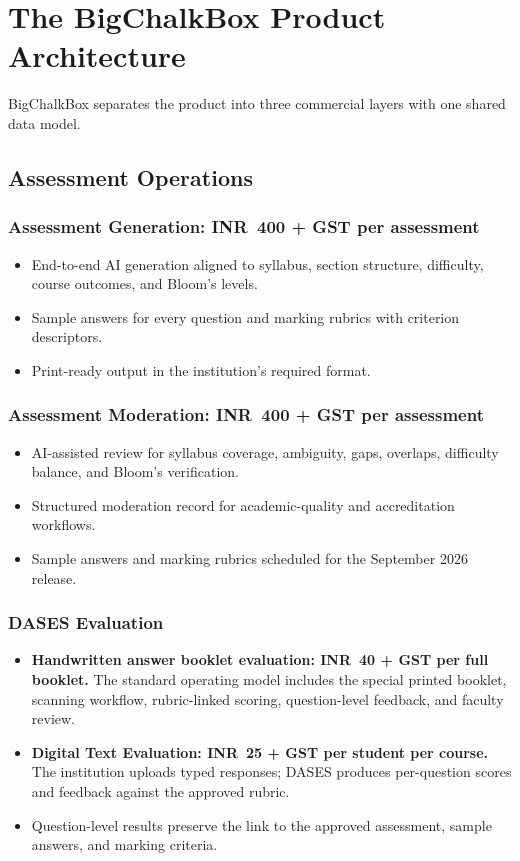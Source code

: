 \documentclass[11pt,a4paper]{article}
\newcommand{\rs}{INR}
\begin{document}
\section{The BigChalkBox Product Architecture}

BigChalkBox separates the product into three commercial layers with one shared data model.

\subsection{Assessment Operations}

\subsubsection{Assessment Generation: \rs\ 400 + GST per assessment}
\begin{itemize}
  \item End-to-end AI generation aligned to syllabus, section structure, difficulty, course outcomes, and Bloom's levels.
  \item Sample answers for every question and marking rubrics with criterion descriptors.
  \item Print-ready output in the institution's required format.
\end{itemize}

\subsubsection{Assessment Moderation: \rs\ 400 + GST per assessment}
\begin{itemize}
  \item AI-assisted review for syllabus coverage, ambiguity, gaps, overlaps, difficulty balance, and Bloom's verification.
  \item Structured moderation record for academic-quality and accreditation workflows.
  \item Sample answers and marking rubrics scheduled for the September 2026 release.
\end{itemize}

\subsubsection{DASES Evaluation}
\begin{itemize}
  \item \textbf{Handwritten answer booklet evaluation: \rs\ 40 + GST per full booklet.} The standard operating model includes the special printed booklet, scanning workflow, rubric-linked scoring, question-level feedback, and faculty review.
  \item \textbf{Digital Text Evaluation: \rs\ 25 + GST per student per course.} The institution uploads typed responses; DASES produces per-question scores and feedback against the approved rubric.
  \item Question-level results preserve the link to the approved assessment, sample answers, and marking criteria.
\end{itemize}
\end{document}
